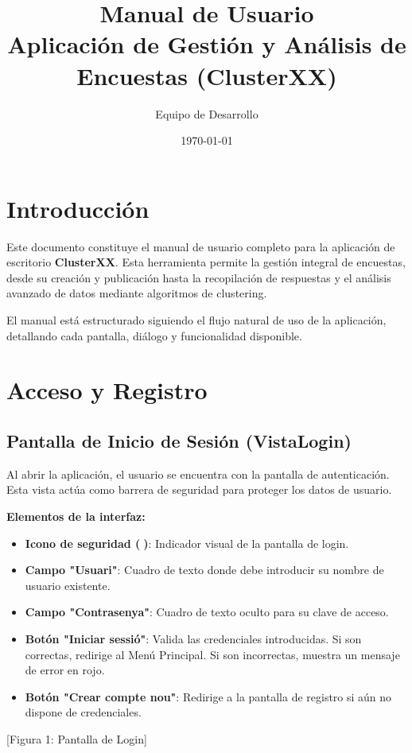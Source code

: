 \documentclass[a4paper,12pt]{article}
\title{\textbf{Manual de Usuario} \\ \large Aplicación de Gestión y Análisis de Encuestas (ClusterXX)}
\author{Equipo de Desarrollo}
\date{\today}
\begin{document}
\maketitle
\tableofcontents
\newpage

\section{Introducción}
Este documento constituye el manual de usuario completo para la aplicación de escritorio \textbf{ClusterXX}. Esta herramienta permite la gestión integral de encuestas, desde su creación y publicación hasta la recopilación de respuestas y el análisis avanzado de datos mediante algoritmos de clustering.

El manual está estructurado siguiendo el flujo natural de uso de la aplicación, detallando cada pantalla, diálogo y funcionalidad disponible.

\section{Acceso y Registro}

\subsection{Pantalla de Inicio de Sesión (VistaLogin)}
Al abrir la aplicación, el usuario se encuentra con la pantalla de autenticación. Esta vista actúa como barrera de seguridad para proteger los datos de usuario.

\textbf{Elementos de la interfaz:}
\begin{itemize}
    \item \textbf{Icono de seguridad (🔐)}: Indicador visual de la pantalla de login.
    \item \textbf{Campo "Usuari"}: Cuadro de texto donde debe introducir su nombre de usuario existente.
    \item \textbf{Campo "Contrasenya"}: Cuadro de texto oculto para su clave de acceso.
    \item \textbf{Botón "Iniciar sessió"}: Valida las credenciales introducidas. Si son correctas, redirige al Menú Principal. Si son incorrectas, muestra un mensaje de error en rojo.
    \item \textbf{Botón "Crear compte nou"}: Redirige a la pantalla de registro si aún no dispone de credenciales.
\end{itemize}

[Figura 1: Pantalla de Login]
\end{document}
